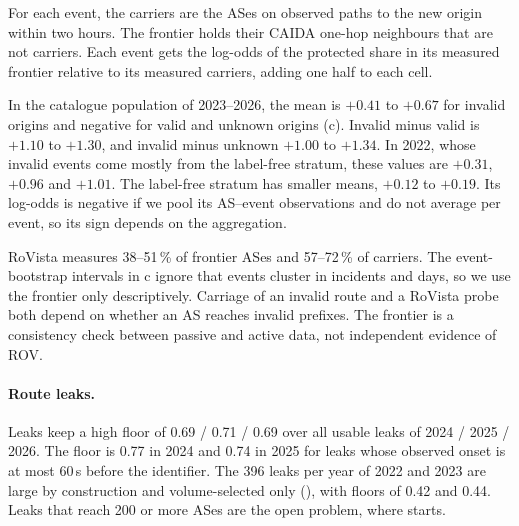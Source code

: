 For each event, the carriers are the ASes on observed paths to the new origin within two hours.
The frontier holds their CAIDA one-hop neighbours that are not carriers.
Each event gets the log-odds of the protected share in its measured frontier relative to its measured carriers, adding one half to each cell.

In the catalogue population of 2023--2026, the mean is $+0.41$ to $+0.67$ for invalid origins and negative for valid and unknown origins (c).
Invalid minus valid is $+1.10$ to $+1.30$, and invalid minus unknown $+1.00$ to $+1.34$.
In 2022, whose invalid events come mostly from the label-free stratum, these values are $+0.31$, $+0.96$ and $+1.01$.
The label-free stratum has smaller means, $+0.12$ to $+0.19$.
Its log-odds is negative if we pool its AS--event observations and do not average per event, so its sign depends on the aggregation.

RoVista measures 38--51\,\% of frontier ASes and 57--72\,\% of carriers.
The event-bootstrap intervals in c ignore that events cluster in incidents and days, so we use the frontier only descriptively.
Carriage of an invalid route and a RoVista probe both depend on whether an AS reaches invalid prefixes.
The frontier is a consistency check between passive and active data, not independent evidence of ROV.

\paragraph{Route leaks.}
Leaks keep a high floor of 0.69 / 0.71 / 0.69 over all usable leaks of 2024 / 2025 / 2026.
The floor is 0.77 in 2024 and 0.74 in 2025 for leaks whose observed onset is at most 60\,s before the identifier.
The 396 leaks per year of 2022 and 2023 are large by construction and volume-selected only (), with floors of 0.42 and 0.44.
Leaks that reach 200 or more ASes are the open problem, where  starts.
